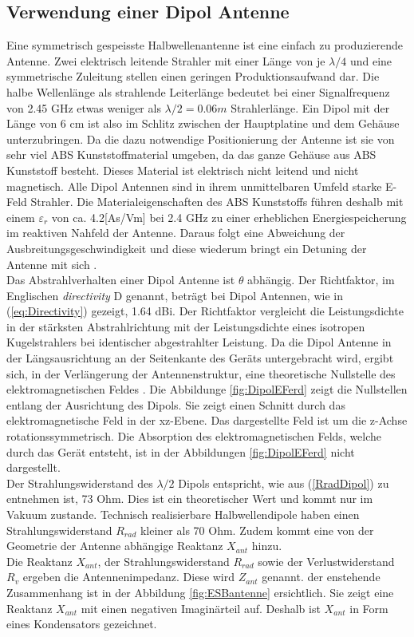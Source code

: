 \subsection{Verwendung einer Dipol Antenne}
Eine symmetrisch gespeisste Halbwellenantenne ist eine einfach zu produzierende Antenne. Zwei elektrisch leitende Strahler mit  einer Länge von je $\lambda/4$ und eine symmetrische Zuleitung stellen einen geringen Produktionsaufwand dar. Die halbe Wellenlänge als strahlende Leiterlänge bedeutet bei einer Signalfrequenz von 2.45 GHz etwas weniger als $\lambda/2=0.06m$ Strahlerlänge. Ein Dipol mit der Länge von 6 cm ist also im Schlitz zwischen der Hauptplatine und dem Gehäuse unterzubringen. 
Da die dazu notwendige Positionierung der Antenne ist sie von sehr viel ABS Kunststoffmaterial umgeben, da das ganze Gehäuse aus ABS Kunststoff besteht. Dieses Material ist elektrisch nicht leitend und nicht magnetisch. Alle Dipol Antennen sind in ihrem unmittelbaren Umfeld starke E-Feld Strahler. Die Materialeigenschaften des ABS Kunststoffs führen deshalb mit einem $\varepsilon_r$ von ca. 4.2[As/Vm] bei 2.4 GHz zu einer erheblichen Energiespeicherung im reaktiven Nahfeld der Antenne. Daraus folgt eine Abweichung der Ausbreitungsgeschwindigkeit und diese wiederum bringt ein Detuning der Antenne mit sich \cite{WikiPermitt}.\\

Das Abstrahlverhalten einer Dipol Antenne ist $\theta$ abhängig. Der Richtfaktor, im Englischen \textit{directivity} D genannt, beträgt bei Dipol Antennen, wie in (\ref{eq:Directivity}) gezeigt, 1.64 dBi. Der Richtfaktor vergleicht die Leistungsdichte in der stärksten Abstrahlrichtung mit der Leistungsdichte eines isotropen Kugelstrahlers bei identischer abgestrahlter Leistung. Da die Dipol Antenne in der Längsausrichtung an der Seitenkante des Geräts untergebracht wird, ergibt sich, in der Verlängerung der Antennenstruktur, eine theoretische Nullstelle des elektromagnetischen Feldes . Die Abbildunge \ref{fig:DipolEFerd} zeigt die Nullstellen entlang der Ausrichtung des Dipols. Sie zeigt einen Schnitt durch das elektromagnetische Feld in der xz-Ebene. Das dargestellte Feld ist um die z-Achse rotationssymmetrisch. Die Absorption des elektromagnetischen Felds, welche durch das Gerät entsteht, ist in der Abbildungen \ref{fig:DipolEFerd} nicht dargestellt.\\
Der Strahlungswiderstand des $\lambda/2$ Dipols entspricht, wie aus (\ref{RradDipol}) zu entnehmen ist, 73 Ohm. Dies ist ein theoretischer Wert und kommt nur im Vakuum zustande. Technisch realisierbare Halbwellendipole haben einen Strahlungswiderstand $R_{rad}$ kleiner als 70 Ohm. Zudem kommt eine von der Geometrie der Antenne abhängige Reaktanz $X_{ant}$ hinzu.\\
Die Reaktanz $X_{ant}$, der Strahlungswiderstand $R_{rad}$ sowie der Verlustwiderstand $R_v$ ergeben die Antennenimpedanz. Diese wird $Z_{ant}$ genannt. der enstehende Zusammenhang ist in der Abbildung \ref{fig:ESBantenne} ersichtlich. Sie zeigt eine Reaktanz $X_{ant}$ mit einen negativen Imaginärteil auf. Deshalb ist $X_{ant}$ in Form eines Kondensators gezeichnet.

